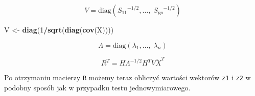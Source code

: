 \documentclass[polish,]{book}
\newenvironment{Shaded}{\begin{snugshade}}{\end{snugshade}}
\newcommand{\DecValTok}[1]{\textcolor[rgb]{0.00,0.00,0.81}{#1}}
\newcommand{\KeywordTok}[1]{\textcolor[rgb]{0.13,0.29,0.53}{\textbf{#1}}}
\newcommand{\NormalTok}[1]{#1}
\newcommand{\OperatorTok}[1]{\textcolor[rgb]{0.81,0.36,0.00}{\textbf{#1}}}
\newcommand{\StringTok}[1]{\textcolor[rgb]{0.31,0.60,0.02}{#1}}
\begin{document}
\begin{equation}
V=\mbox{diag}\left({S_{11}}^{-1/2},\ldots,\;{S_{pp}}^{-1/2}\right)
\label{eq:wz1125}
\end{equation}

\begin{Shaded}
\begin{Highlighting}[]
\NormalTok{V <-}\StringTok{ }\KeywordTok{diag}\NormalTok{(}\DecValTok{1}\OperatorTok{/}\KeywordTok{sqrt}\NormalTok{(}\KeywordTok{diag}\NormalTok{(}\KeywordTok{cov}\NormalTok{(X))))}
\end{Highlighting}
\end{Shaded}

\begin{equation}
\Lambda=\mbox{diag}(\lambda_1,\ldots,\;\lambda_n)
\label{eq:wz1126}
\end{equation}

\begin{Shaded}
\end{Shaded}

\begin{equation}
R^T=H\Lambda^{-1/2}H^TV\check{X}^{T}
\label{eq:wz1127}
\end{equation}

\begin{Shaded}
\end{Shaded}

Po otrzymaniu macierzy \texttt{R} możemy teraz obliczyć wartości wektorów \texttt{z1} i \texttt{z2} w
podobny sposób jak w przypadku testu jednowymiarowego.
\end{document}
